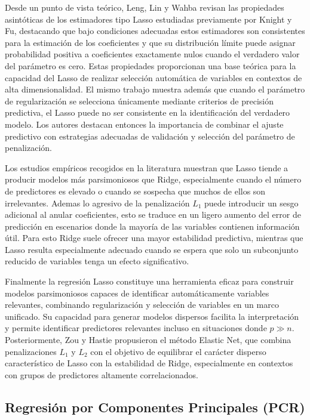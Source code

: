 \documentclass[12pt,a4paper]{report}
\begin{document}
Desde un punto de vista teórico, Leng, Lin y Wahba \cite{leng2006} revisan las propiedades asintóticas de los estimadores tipo Lasso estudiadas previamente por Knight y Fu, destacando que bajo condiciones adecuadas estos estimadores son consistentes para la estimación de los coeficientes y que su distribución límite puede asignar probabilidad positiva a coeficientes exactamente nulos cuando el verdadero valor del parámetro es cero. Estas propiedades proporcionan una base teórica para la capacidad del Lasso de realizar selección automática de variables en contextos de alta dimensionalidad. El mismo trabajo muestra además que cuando el parámetro de regularización se selecciona únicamente mediante criterios de precisión predictiva, el Lasso puede no ser consistente en la identificación del verdadero modelo. Los autores destacan entonces la importancia de combinar el ajuste predictivo con estrategias adecuadas de validación y selección del parámetro de penalización.

Los estudios empíricos recogidos en la literatura muestran que Lasso tiende a producir modelos más parsimoniosos que Ridge, especialmente cuando el número de predictores es elevado o cuando se sospecha que muchos de ellos son irrelevantes. Ademas lo agresivo de la penalización \(L_1\) puede introducir un sesgo adicional al anular coeficientes, esto se traduce en un ligero aumento del error de predicción en escenarios donde la mayoría de las variables contienen información útil. Para esto Ridge suele ofrecer una mayor estabilidad predictiva, mientras que Lasso resulta especialmente adecuado cuando se espera que solo un subconjunto reducido de variables tenga un efecto significativo.

Finalmente la regresión Lasso constituye una herramienta eficaz para construir modelos parsimoniosos capaces de identificar automáticamente variables relevantes, combinando regularización y selección de variables en un marco unificado. Su capacidad para generar modelos dispersos facilita la interpretación y permite identificar predictores relevantes incluso en situaciones donde \(p \gg n\). Posteriormente, Zou y Hastie \cite{zou2005} propusieron el método Elastic Net, que combina penalizaciones \(L_1\) y \(L_2\) con el objetivo de equilibrar el carácter disperso característico de Lasso con la estabilidad de Ridge, especialmente en contextos con grupos de predictores altamente correlacionados.


\subsection{Regresión por Componentes Principales (PCR)}
\end{document}
